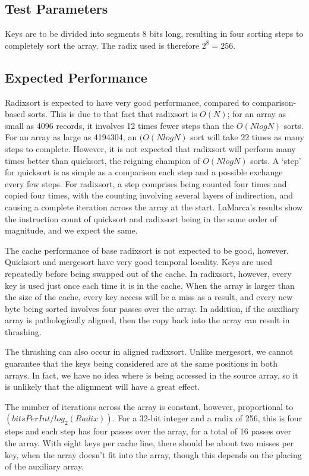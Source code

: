 \subsection{Test Parameters}
Keys are to be divided into segments 8 bits long, resulting in four sorting
steps to completely sort the array. The radix used is therefore $2^8 = 256$.

\subsection{Expected Performance}
Radixsort is expected to have very good performance, compared to
comparison-based sorts. This is due to that fact that radixsort is $O(N)$; for
an array as small as 4096 records, it involves 12 times fewer steps than the
$O(NlogN)$ sorts. For an array as large as 4194304, an $(O(NlogN)$ sort will
take 22 times as many steps to complete. However, it is not expected that
radixsort will perform many times better than quicksort, the reigning champion
of $O(NlogN)$ sorts. A `step' for quicksort is as simple as a comparison each
step and a possible exchange every few steps. For radixsort, a step comprises
being counted four times and copied four times, with the counting involving
several layers of indirection, and causing a complete iteration across the array
at the start. LaMarca's results show the instruction count of quicksort and
radixsort being in the same order of magnitude, and we expect the same.

The cache performance of base radixsort is not expected to be good, however.
Quicksort and mergesort have very good temporal locality. Keys are
used repeatedly before being swapped out of the cache. In radixsort, however,
every key is used just once each time it is in the cache. When the array is larger than
the size of the cache, every key access will be a miss as a result, and every
new byte being sorted involves four passes over the array. In addition, if the
auxiliary array is pathologically aligned, then the copy back into the array
can result in thrashing.

The thrashing can also occur in aligned radixsort. Unlike mergesort, we cannot
guarantee that the keys being considered are at the same positions in both
arrays. In fact, we have no idea where is being accessed in the source array, so
it is unlikely that the alignment will have a great effect.

The number of iterations across the array is constant, however, proportional to
$(bitsPerInt/log_2(Radix))$. For a 32-bit integer and a radix of 256, this is
four steps and each step has four passes over the array, for a total of 16
passes over the array. With eight keys per cache line, there should be about two
misses per key, when the array doesn't fit into the array, though this depends
on the placing of the auxiliary array.

